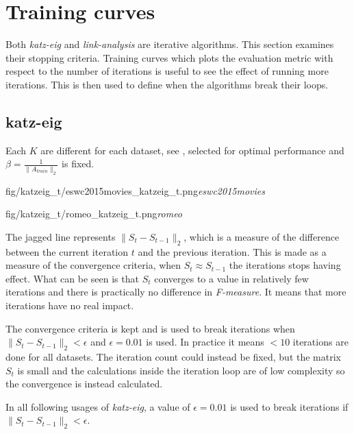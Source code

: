 
\section{Training curves}\label{sec:graphs:training_curves}

Both \textit{katz-eig} and \textit{link-analysis} are iterative algorithms. This section examines their stopping criteria.  Training curves which plots the evaluation metric with respect to the number of iterations is useful to see the effect of running more iterations. This is then used to define when the algorithms break their loops.


\subsection{katz-eig}\label{sec:training:katz}

Each $K$ are different for each dataset, see , selected for optimal performance and $\beta = \frac{1}{\|A_{train}\|_2}$ is fixed.

\FloatBarrier

{fig/katzeig_t/eswc2015movies_katzeig_t.png}{\textit{eswc2015movies}}

{fig/katzeig_t/romeo_katzeig_t.png}{\textit{romeo}}

\FloatBarrier

The jagged line represents $\|S_t - S_{t - 1}\|_2$, which is a measure of the difference between the current iteration $t$ and the previous iteration. This is made as a measure of the convergence criteria, when $S_t \approx S_{t - 1}$ the iterations stops having effect. What can be seen is that $S_t$ converges to a value in relatively few iterations and there is practically no difference in \textit{F-measure}. It means that more iterations have no real impact.

The convergence criteria is kept and is used to break iterations when $\|S_t - S_{t - 1}\|_2 < \epsilon$ and $\epsilon = 0.01$ is used. In practice it means $< 10$ iterations are done for all datasets. The iteration count could instead be fixed, but the matrix $S_t$ is small and the calculations inside the iteration loop are of low complexity so the convergence is instead calculated.

In all following usages of \textit{katz-eig}, a value of $\epsilon = 0.01$ is used to break iterations if $\|S_t - S_{t - 1}\|_2 < \epsilon$.

